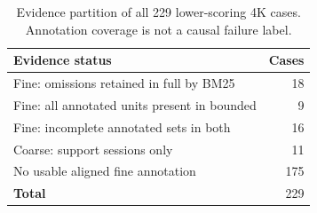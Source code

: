 \begin{table}[H]
\centering
\footnotesize
\setlength{\tabcolsep}{4pt}
\caption{Evidence partition of all 229 lower-scoring 4K cases. Annotation coverage is not a causal failure label.}
\label{tab:sub-audit}
\begin{tabular}{lr}
\toprule
Evidence status & Cases \\
\midrule
Fine: omissions retained in full by BM25 & 18 \\
Fine: all annotated units present in bounded & 9 \\
Fine: incomplete annotated sets in both & 16 \\
Coarse: support sessions only & 11 \\
No usable aligned fine annotation & 175 \\
\textbf{Total} & 229 \\
\bottomrule
\end{tabular}
\end{table}
